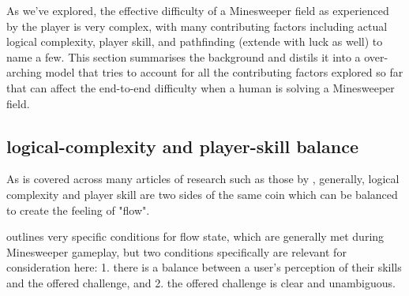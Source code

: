 
As we've explored, the effective difficulty of a Minesweeper field as experienced by the player is very complex, with many contributing factors including actual logical complexity, player skill, and pathfinding (extende with luck as well) to name a few.
This section summarises the background and distils it into a over-arching model that tries to account for all the contributing factors explored so far that can affect the end-to-end difficulty when a human is solving a Minesweeper field.

\subsection{logical-complexity and player-skill balance} \label{awa:challengeSkillBallenceMonolith}


As is covered across many articles of research such as those by \cite{skillChallengeBalance, skillChallengeBalanceAgain, SkillIssueTbh}, generally, logical complexity and player skill are two sides of the same coin which can be balanced to create the feeling of "flow".

\citet{skillChallengeBalanceAgain}outlines very specific conditions for flow state, which are generally met during Minesweeper gameplay,
but two conditions specifically are relevant for consideration here: 1. there is a balance between a user's perception of their skills and the offered challenge, and 2. the offered challenge is clear and unambiguous.


